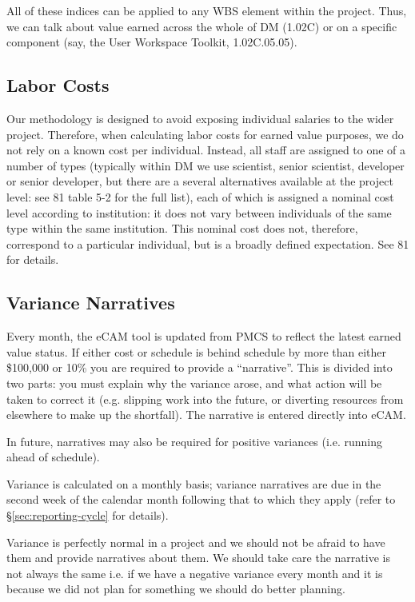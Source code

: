 All of these indices can be applied to any WBS element within the
project. Thus, we can talk about value earned across the whole of DM
(1.02C) or on a specific component (say, the User Workspace Toolkit,
1.02C.05.05).

\subsection{Labor Costs}
\label{sec:labor-costs}

Our methodology is designed to avoid exposing individual salaries to the
wider project. Therefore, when calculating labor costs for earned value
purposes, we do not rely on a known cost per individual. Instead, all
staff are assigned to one of a number of types (typically within DM we
use scientist, senior scientist, developer or senior developer, but
there are a several alternatives available at the project level: see 81
table 5-2 for the full list), each of which is assigned a nominal cost
level according to institution: it does not vary between individuals of
the same type within the same institution. This nominal cost does not,
therefore, correspond to a particular individual, but is a broadly
defined expectation. See 81 for details.

\subsection{Variance Narratives}
\label{sec:variance-narrative}

Every month, the eCAM tool is updated from PMCS to reflect the latest
earned value status. If either cost or schedule is behind schedule by
more than either \$100,000 or 10\% you are required to provide a
``narrative''. This is divided into two parts: you must explain why the
variance arose, and what action will be taken to correct it (e.g.
slipping work into the future, or diverting resources from elsewhere to
make up the shortfall). The narrative is entered directly into eCAM.

In future, narratives may also be required for positive variances (i.e.
running ahead of schedule).

Variance is calculated on a monthly basis; variance narratives are due
in the second week of the calendar month following that to which they
apply (refer to \S\ref{sec:reporting-cycle} for details).

Variance is perfectly normal in a project and we should not be afraid to
have them and provide narratives about them. We should take care the
narrative is not always the same i.e. if we have a negative variance
every month and it is because we did not plan for something we should do
better planning.

